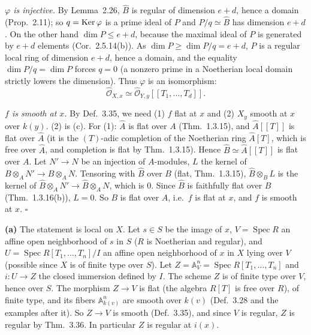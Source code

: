 \documentclass[11pt]{article}
\begin{document}
\emph{$\varphi$ is injective.} By Lemma~2.26, $\widehat B$ is regular of dimension $e+d$, hence a domain (Prop.~2.11); so $q=\operatorname{Ker}\varphi$ is a prime ideal of $P$ and $P/q\simeq\widehat B$ has dimension $e+d$. On the other hand $\dim P\le e+d$, because the maximal ideal of $P$ is generated by $e+d$ elements (Cor.~2.5.14(b)). As $\dim P\ge\dim P/q=e+d$, $P$ is a regular local ring of dimension $e+d$, hence a domain, and the equality $\dim P/q=\dim P$ forces $q=0$ (a nonzero prime in a Noetherian local domain strictly lowers the dimension). Thus $\varphi$ is an isomorphism:
\[ \widehat{\mathcal O}_{X,x}\simeq\widehat{\mathcal O}_{Y,y}[[T_1,\dots,T_d]]. \]

\emph{$f$ is smooth at $x$.} By Def.~3.35, we need (1) $f$ flat at $x$ and (2) $X_y$ smooth at $x$ over $k(y)$. (2) is (c). For (1): $\widehat A$ is flat over $A$ (Thm.~1.3.15), and $\widehat A[[T]]$ is flat over $\widehat A$ (it is the $(T)$-adic completion of the Noetherian ring $\widehat A[T]$, which is free over $\widehat A$, and completion is flat by Thm.~1.3.15). Hence $\widehat B\simeq\widehat A[[T]]$ is flat over $A$. Let $N'\to N$ be an injection of $A$-modules, $L$ the kernel of $B\otimes_AN'\to B\otimes_AN$. Tensoring with $\widehat B$ over $B$ (flat, Thm.~1.3.15), $\widehat B\otimes_BL$ is the kernel of $\widehat B\otimes_AN'\to\widehat B\otimes_AN$, which is $0$. Since $\widehat B$ is faithfully flat over $B$ (Thm.~1.3.16(b)), $L=0$. So $B$ is flat over $A$, i.e.\ $f$ is flat at $x$, and $f$ is smooth at $x$. \hfill$\square$

\pf
\textbf{(a)} The statement is local on $X$. Let $s\in S$ be the image of $x$, $V=\operatorname{Spec}R$ an affine open neighborhood of $s$ in $S$ ($R$ is Noetherian and regular), and $U=\operatorname{Spec}R[T_1,\dots,T_n]/I$ an affine open neighborhood of $x$ in $X$ lying over $V$ (possible since $X$ is of finite type over $S$). Let $Z=\mathbb A^n_V=\operatorname{Spec}R[T_1,\dots,T_n]$ and $i:U\to Z$ the closed immersion defined by $I$. The scheme $Z$ is of finite type over $V$, hence over $S$. The morphism $Z\to V$ is flat (the algebra $R[T]$ is free over $R$), of finite type, and its fibers $\mathbb A^n_{k(v)}$ are smooth over $k(v)$ (Def.~3.28 and the examples after it). So $Z\to V$ is smooth (Def.~3.35), and since $V$ is regular, $Z$ is regular by Thm.~3.36. In particular $Z$ is regular at $i(x)$.
\end{document}
